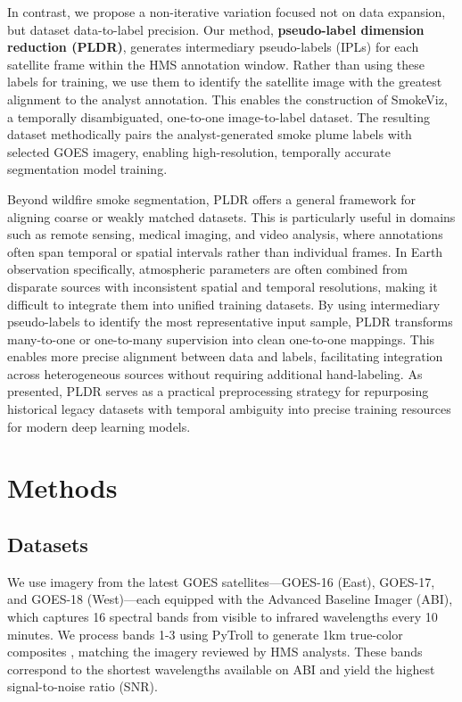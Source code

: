\documentclass{article}
\begin{document}
In contrast, we propose a non-iterative variation focused not on data expansion, but dataset data-to-label precision. Our method, \textbf{pseudo-label dimension reduction (PLDR)}, generates intermediary pseudo-labels (IPLs) for each satellite frame within the HMS annotation window. Rather than using these labels for training, we use them to identify the satellite image with the greatest alignment to the analyst annotation. This enables the construction of SmokeViz, a temporally disambiguated, one-to-one image-to-label dataset. The resulting dataset methodically pairs the analyst-generated smoke plume labels with selected GOES imagery, enabling high-resolution, temporally accurate segmentation model training.


Beyond wildfire smoke segmentation, PLDR offers a general framework for aligning coarse or weakly matched datasets. This is particularly useful in domains such as remote sensing, medical imaging, and video analysis, where annotations often span temporal or spatial intervals rather than individual frames. In Earth observation specifically, atmospheric parameters are often combined from disparate sources with inconsistent spatial and temporal resolutions, making it difficult to integrate them into unified training datasets. By using intermediary pseudo-labels to identify the most representative input sample, PLDR transforms many-to-one or one-to-many supervision into clean one-to-one mappings. This enables more precise alignment between data and labels, facilitating integration across heterogeneous sources without requiring additional hand-labeling. As presented, PLDR serves as a practical preprocessing strategy for repurposing historical legacy datasets with temporal ambiguity into precise training resources for modern deep learning models.

\section{Methods}
\subsection{Datasets}

We use imagery from the latest GOES satellites—GOES-16 (East), GOES-17, and GOES-18 (West)—each equipped with the Advanced Baseline Imager (ABI), which captures 16 spectral bands from visible to infrared wavelengths every 10 minutes. We process bands 1-3 using PyTroll \cite{satpy} to generate 1km true-color composites \cite{true_color}, matching the imagery reviewed by HMS analysts. These bands correspond to the shortest wavelengths available on ABI and yield the highest signal-to-noise ratio (SNR).
\end{document}
